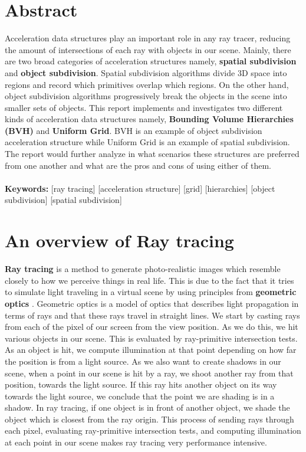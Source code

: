 \documentclass[11pt,a4paper]{article}
\begin{document}
\section{Abstract}
Acceleration data structures play an important role in any ray tracer, reducing the amount of intersections of each ray with objects in our scene. Mainly, there are two broad categories of acceleration structures namely, \textbf{spatial subdivision} and \textbf{object subdivision}. Spatial subdivision algorithms divide 3D space into regions and record which primitives overlap which regions. On the other hand, object subdivision algorithms progressively break the objects in the scene into smaller sets of objects. This report implements and investigates two different kinds of acceleration data structures namely, \textbf{Bounding Volume Hierarchies (BVH)} and \textbf{Uniform Grid}. BVH is an example of object subdivision acceleration structure while Uniform Grid is an example of spatial subdivision. The report would further analyze in what scenarios these structures are preferred from one another and what are the pros and cons of using either of them.
\\~\\
\noindent
\textbf{Keywords:} [ray tracing] [acceleration structure] [grid] [hierarchies] [object subdivision] [spatial subdivision]

\section{An overview of Ray tracing}
\textbf{Ray tracing} is a method to generate photo-realistic images which resemble closely to how we perceive things in real life. This is due to the fact that it tries to simulate light traveling in a virtual scene by using principles from \textbf{geometric optics} \cite{geometricoptics}. Geometric optics is a model of optics that describes light propagation in terms of rays and that these rays travel in straight lines.  We start by casting rays from each of the pixel of our
screen from the view position. As we do this, we hit various objects in our scene. This is evaluated by
ray-primitive intersection tests. As an object is hit, we compute illumination at that point depending
on how far the position is from a light source. As we also want to create shadows in our scene, when
a point in our scene is hit by a ray, we shoot another ray from that position, towards
the light source. If this ray hits another object on its way towards the light source, we conclude that
the point we are shading is in a shadow. In ray tracing, if one object is in front of another object, we
shade the object which is closest from the ray origin. This process of sending rays through each pixel,
evaluating ray-primitive intersection tests, and computing illumination at each point in our scene makes
ray tracing very performance intensive.
\end{document}
